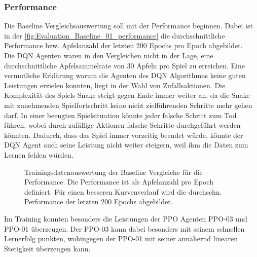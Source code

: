 \subsubsection{Performance}
Die Baseline Vergleichsauswertung soll mit der Performance beginnen. Dabei ist in der \autoref{fig:Evaluation_Baseline_01_performance} die durchschnittliche Performance bzw. Apfelanzahl der letzten 200 Epochs pro Epoch abgebildet.\\
Die DQN Agenten waren in den Vergleichen nicht in der Lage, eine durchschnittliche Apfelsammelrate von 30 Äpfeln pro Spiel zu erreichen. 
Eine vermutliche Erklärung warum die Agenten des DQN Algorithmus keine guten Leistungen erzielen konnten, liegt in der Wahl von Zufallsaktionen. Die Komplexität des Spiels Snake steigt gegen Ende immer weiter an, da die Snake mit zunehmenden Spielfortschritt keine nicht zielführenden Schritte mehr gehen darf. In einer beengten Spielsituation könnte jeder falsche Schritt zum Tod führen, wobei durch zufällige Aktionen falsche Schritte durchgeführt werden könnten. Dadurch, dass das Spiel immer vorzeitig beendet würde, könnte der DQN Agent auch seine Leistung nicht weiter steigern, weil ihm die Daten zum Lernen fehlen würden.
\begin{figure}[H]
	\centering
	
	\caption[Performance - Auswertung der Trainingsdaten der Baseline Vergleiche]{Trainingsdatenauswertung der Baseline Vergleiche für die Performance. Die Performance ist als Apfelanzahl pro Epoch definiert. Für einen besseren Kurvenverlauf wird die durchschn. Performance der letzten 200 Epochs abgebildet.}
	\label{fig:Evaluation_Baseline_01_performance}
\end{figure}
Im Training konnten besonders die Leistungen der PPO Agenten PPO-03 und PPO-01 überzeugen. 
Der PPO-03 kann dabei besonders mit seinem schnellen Lernerfolg punkten, wohingegen der PPO-01 mit seiner annähernd linearen Stetigkeit überzeugen kann.

